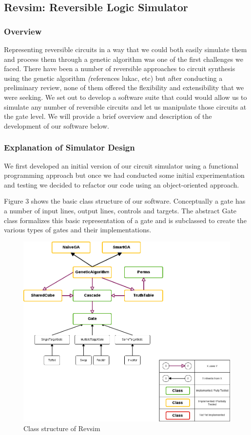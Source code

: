 \subsection{Revsim: Reversible Logic Simulator}
  \subsubsection{Overview}

Representing reversible circuits in a way that we could both easily simulate them and process them through 
a genetic algorithm was one of the first challenges we faced. There have been a number of reversible approaches 
to circuit synthesis using the genetic algorithm \emph(references lukac, etc) but after conducting a preliminary 
review, none of them offered the flexibility and extensibility that we were seeking. We set out to develop a 
software suite that could would allow us to simulate any number of reversible circuits and let us manipulate those 
circuits at the gate level. We will provide a brief overview and description of the development of our software below.

  \subsubsection{Explanation of Simulator Design}

We first developed an initial version of our circuit simulator using a functional programming approach but once we had conducted some initial 
experimentation and testing we decided to refactor our code using an object-oriented approach.

Figure 3 shows the basic class structure of our software. Conceptually a gate has a number of input lines, output lines, 
controls and targets. The abstract Gate class formalizes this basic representation of a gate and is subclassed to create 
the various types of gates and their implementations.

\begin{figure}[ht!]
\centering
\includegraphics[width=140mm]{diagrams/architecture.png}
\caption{Class structure of Revsim}
\label{overflow}
\end{figure}

